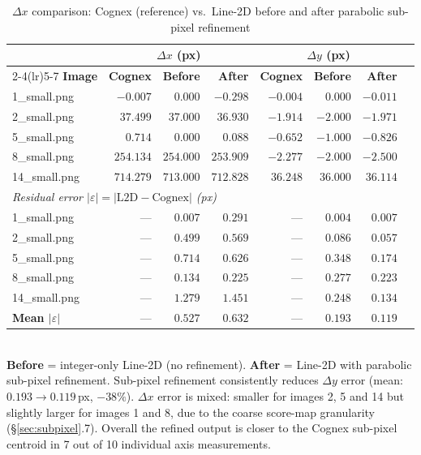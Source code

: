\documentclass[12pt,a4paper]{article}
\begin{document}
\begin{table}[H]
  \centering
  \caption{$\Delta x$ comparison: Cognex (reference) vs.\ Line-2D before and
           after parabolic sub-pixel refinement}
  \label{tab:subpixel_motivation}
  \setlength{\tabcolsep}{5pt}
  \begin{tabular}{lrrrrrrr}
    \toprule
    & \multicolumn{3}{c}{\textbf{$\Delta x$ (px)}}
    & \multicolumn{3}{c}{\textbf{$\Delta y$ (px)}} \\
    \cmidrule(lr){2-4}\cmidrule(lr){5-7}
    \textbf{Image}
      & \textbf{Cognex}
      & \textbf{Before}
      & \textbf{After}
      & \textbf{Cognex}
      & \textbf{Before}
      & \textbf{After} \\
    \midrule
    1\_small.png  & $-0.007$ & $0.000$ & $-0.298$ & $-0.004$ & $0.000$ & $-0.011$ \\
    2\_small.png  & $37.499$ & $37.000$ & $36.930$ & $-1.914$ & $-2.000$ & $-1.971$ \\
    5\_small.png  & $0.714$  & $0.000$ & $0.088$  & $-0.652$ & $-1.000$ & $-0.826$ \\
    8\_small.png  & $254.134$& $254.000$& $253.909$& $-2.277$ & $-2.000$ & $-2.500$ \\
    14\_small.png & $714.279$& $713.000$& $712.828$& $36.248$ & $36.000$ & $36.114$ \\
    \midrule
    \multicolumn{7}{l}{\textit{Residual error $|\varepsilon| = |\text{L2D} - \text{Cognex}|$ (px)}} \\
    \midrule
    1\_small.png  & --- & $0.007$ & $0.291$ & --- & $0.004$ & $0.007$ \\
    2\_small.png  & --- & $0.499$ & $0.569$ & --- & $0.086$ & $0.057$ \\
    5\_small.png  & --- & $0.714$ & $0.626$ & --- & $0.348$ & $0.174$ \\
    8\_small.png  & --- & $0.134$ & $0.225$ & --- & $0.277$ & $0.223$ \\
    14\_small.png & --- & $1.279$ & $1.451$ & --- & $0.248$ & $0.134$ \\
    \midrule
    \textbf{Mean $|\varepsilon|$} & --- & $\mathbf{0.527}$ & $\mathbf{0.632}$
                                  & --- & $\mathbf{0.193}$ & $\mathbf{0.119}$ \\
    \bottomrule
  \end{tabular}
  \smallskip\\
  {\small \textbf{Before} = integer-only Line-2D (no refinement).
           \textbf{After}  = Line-2D with parabolic sub-pixel refinement.
           Sub-pixel refinement consistently reduces $\Delta y$ error
           (mean: $0.193 \to 0.119$\,px, $-38\%$).
           $\Delta x$ error is mixed: smaller for images 2, 5 and 14 but
           slightly larger for images 1 and 8, due to the coarse score-map
           granularity (§\ref{sec:subpixel}.7).
           Overall the refined output is closer to the Cognex sub-pixel
           centroid in 7 out of 10 individual axis measurements.}
\end{table}
\end{document}
